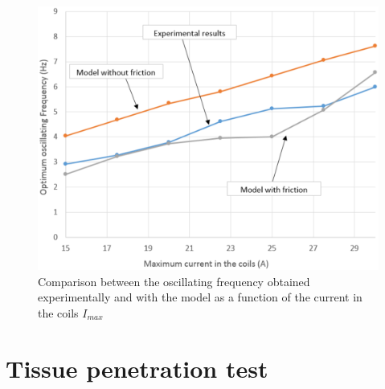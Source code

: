 \documentclass[letterpaper, 10 pt, conference]{ieeeconf}  %
\begin{document}
\begin{figure}
  \includegraphics[width=\linewidth]{figure3.eps}
  \caption{Comparison between the oscillating frequency obtained experimentally and with the model as a function of the current in the coils $I_{max}$}
  \label{freq}
\end{figure}


\section{Tissue penetration test}


   
\end{document}
